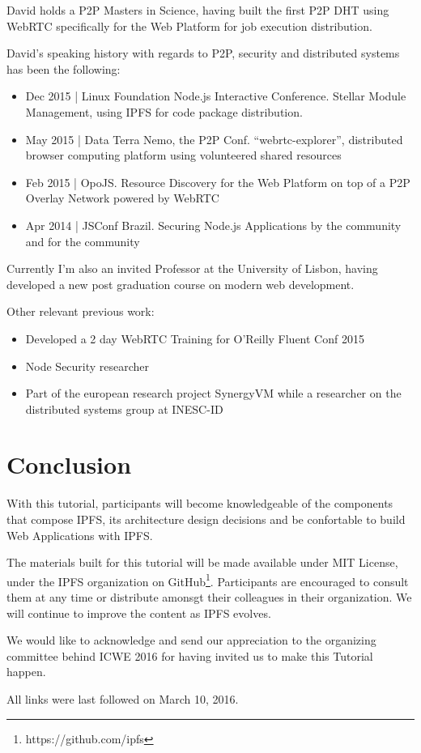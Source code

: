 \documentclass[runningheads,a4paper]{llncs}
\begin{document}
David holds a P2P Masters in Science, having built the first P2P DHT using WebRTC specifically for the Web Platform for job execution distribution.

David's speaking history with regards to P2P, security and distributed systems has been the following:

\begin{itemize}
  \item Dec 2015 | Linux Foundation Node.js Interactive Conference. Stellar Module
Management, using IPFS for code package distribution.
  \item May 2015 | Data Terra Nemo, the P2P Conf. ``webrtc-explorer'', distributed browser
computing platform using volunteered shared resources
  \item Feb 2015 | OpoJS\@. Resource Discovery for the Web Platform on top of a P2P
Overlay Network powered by WebRTC
  \item Apr 2014 | JSConf Brazil. Securing Node.js Applications by the community and for
the community
\end{itemize}

Currently I'm also an invited Professor at the University of Lisbon, having developed a new post graduation course on modern web development.

Other relevant previous work:

\begin{itemize}
  \item Developed a 2 day WebRTC Training for O'Reilly Fluent Conf 2015
  \item Node Security researcher
  \item Part of the european research project SynergyVM while a researcher on the
distributed systems group at INESC-ID
\end{itemize}


\section{Conclusion}\label{sec:conclusion}

With this tutorial, participants will become knowledgeable of the components that compose IPFS, its architecture design decisions and be confortable to build Web Applications with IPFS\@.

The materials built for this tutorial will be made available under MIT License, under the IPFS organization on GitHub\footnote{https://github.com/ipfs}. Participants are encouraged to consult them at any time or distribute amonsgt their colleagues in their organization. We will continue to improve the content as IPFS evolves.

We would like to acknowledge and send our appreciation to the organizing committee behind ICWE 2016 for having invited us to make this Tutorial happen.





All links were last followed on March 10, 2016.
\end{document}
